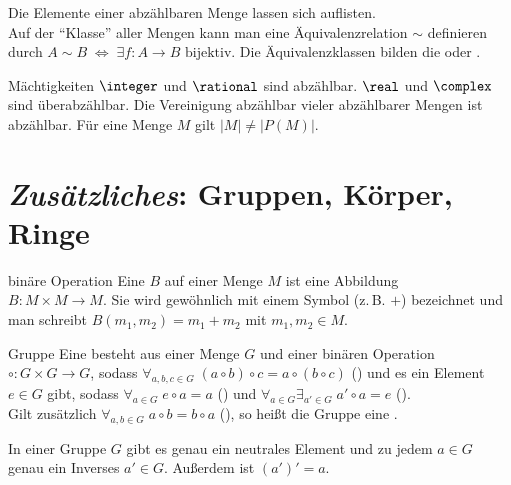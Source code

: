 \begin{Bem}
    Die Elemente einer abzählbaren Menge lassen sich auflisten. \\
    Auf der "`Klasse"' aller Mengen kann man eine Äquivalenzrelation $\sim$
    definieren durch $A \sim B \;\Leftrightarrow\;
    \exists f: A \rightarrow B \text{ bijektiv}$.
    Die Äquivalenzklassen bilden die  oder
    .
\end{Bem}

\begin{Satz}{Mächtigkeiten}
    $\integer$ und $\rational$ sind abzählbar.
    $\real$ und $\complex$ sind überabzählbar.
    Die Vereinigung abzählbar vieler abzählbarer Mengen ist abzählbar.
    Für eine Menge $M$ gilt $|M| \not= |P(M)|$.
\end{Satz}

\section{%
    \emph{Zusätzliches}: Gruppen, Körper, Ringe%
}

\begin{Def}{binäre Operation}
    Eine  $B$ auf einer Menge $M$ ist eine
    Abbildung  \\
    $B: M \times M \rightarrow M$.
    Sie wird gewöhnlich mit einem Symbol (z.\,B. $+$) bezeichnet
    und man schreibt $B(m_1, m_2) = m_1 + m_2$ mit $m_1, m_2 \in M$.
\end{Def}

\begin{Def}{Gruppe}
    Eine  besteht aus einer Menge $G$ und einer binären
    Operation $\circ: G \times G \rightarrow G$, sodass
    $\forall_{a, b, c \in G}\; (a \circ b) \circ c = a \circ (b \circ c)$
    () und es ein Element $e \in G$ gibt, sodass
    $\forall_{a \in G}\; e \circ a = a$ () und
    $\forall_{a \in G} \exists_{a' \in G}\; a' \circ a = e$
    (). \\
    Gilt zusätzlich $\forall_{a, b \in G}\; a \circ b = b \circ a$
    (), so heißt die Gruppe eine
    .
\end{Def}

\begin{Bem}
    In einer Gruppe $G$ gibt es genau ein neutrales Element und zu jedem
    $a \in G$ genau ein Inverses $a' \in G$.
    Außerdem ist $(a')' = a$.
\end{Bem}


